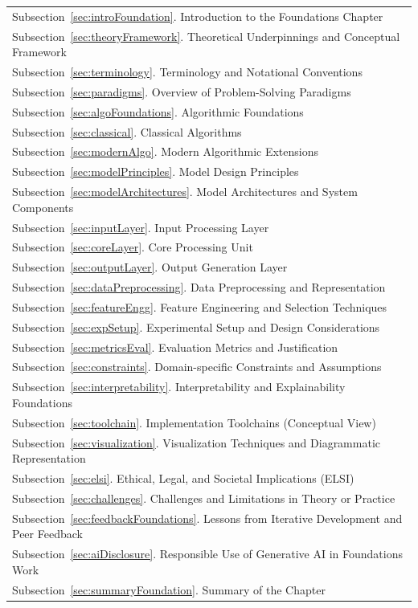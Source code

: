 \documentclass[10pt]{article}
\begin{document}
\begin{margintable}\vspace{1.4in}\footnotesize
\begin{tabularx}{\marginparwidth}{|X}
  Subsection~\ref{sec:introFoundation}. Introduction to the Foundations Chapter\\
  Subsection~\ref{sec:theoryFramework}. Theoretical Underpinnings and Conceptual Framework\\
  Subsection~\ref{sec:terminology}. Terminology and Notational Conventions\\
  Subsection~\ref{sec:paradigms}. Overview of Problem-Solving Paradigms\\
  Subsection~\ref{sec:algoFoundations}. Algorithmic Foundations\\
  Subsection~\ref{sec:classical}. Classical Algorithms\\
  Subsection~\ref{sec:modernAlgo}. Modern Algorithmic Extensions\\
  Subsection~\ref{sec:modelPrinciples}. Model Design Principles\\
  Subsection~\ref{sec:modelArchitectures}. Model Architectures and System Components\\
  Subsection~\ref{sec:inputLayer}. Input Processing Layer\\
  Subsection~\ref{sec:coreLayer}. Core Processing Unit\\
  Subsection~\ref{sec:outputLayer}. Output Generation Layer\\
  Subsection~\ref{sec:dataPreprocessing}. Data Preprocessing and Representation\\
  Subsection~\ref{sec:featureEngg}. Feature Engineering and Selection Techniques\\
  Subsection~\ref{sec:expSetup}. Experimental Setup and Design Considerations\\
  Subsection~\ref{sec:metricsEval}. Evaluation Metrics and Justification\\
  Subsection~\ref{sec:constraints}. Domain-specific Constraints and Assumptions\\
  Subsection~\ref{sec:interpretability}. Interpretability and Explainability Foundations\\
  Subsection~\ref{sec:toolchain}. Implementation Toolchains (Conceptual View)\\
  Subsection~\ref{sec:visualization}. Visualization Techniques and Diagrammatic Representation\\
  Subsection~\ref{sec:elsi}. Ethical, Legal, and Societal Implications (ELSI)\\
  Subsection~\ref{sec:challenges}. Challenges and Limitations in Theory or Practice\\
  Subsection~\ref{sec:feedbackFoundations}. Lessons from Iterative Development and Peer Feedback\\
  Subsection~\ref{sec:aiDisclosure}. Responsible Use of Generative AI in Foundations Work\\
  Subsection~\ref{sec:summaryFoundation}. Summary of the Chapter\\
\end{tabularx}
\end{margintable}
\end{document}
